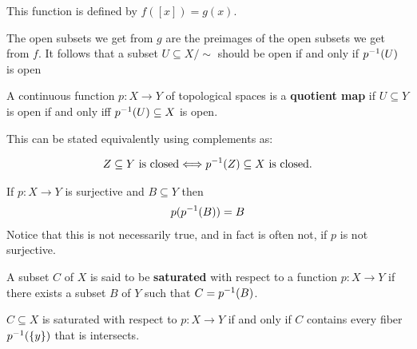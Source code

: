 \documentclass[12pt, twosided]{article}
\begin{document}
This function is defined by \(f([x]) = g(x)\).

\begin{clm}
  The open subsets we get from \(g\) are the preimages of the open subsets we get from \(f\). It follows that a subset \(U \subseteq X / \sim\) should be open if and only if \(p^{-1}(U)\) is open
\end{clm}

\begin{df}
  A continuous function \(p: X \to Y\) of topological spaces is a \textbf{quotient map} if \(U \subseteq Y\) is open if and only iff \(p^{-1}(U) \subseteq X\) is open.

  This can be stated equivalently using complements as:

  \begin{align*}
    Z \subseteq Y \text{ is closed} \Longleftrightarrow p^{-1}(Z) \subseteq X \text{ is closed}.
  \end{align*}
\end{df}


\begin{fact}
  If \(p:X \to Y\) is surjective and \(B \subseteq Y\) then
  \begin{align*}
    p(p^{-1}(B)) = B
  \end{align*}
  Notice that this is not necessarily true, and in fact is often not, if \(p\) is not surjective.
\end{fact}

\begin{df}
  A subset \(C\) of \(X\) is said to be \textbf{saturated} with respect to a function \(p: X \to Y\) if there exists a subset \(B\) of \(Y\) such that \(C = p^{-1}(B)\).
\end{df}

\begin{lm}
  \(C \subseteq X\) is saturated with respect to \(p: X \to Y\) if and only if \(C\) contains every fiber \(p^{-1}(\left\{ y \right\} )\) that is intersects.
\end{lm}
\end{document}
